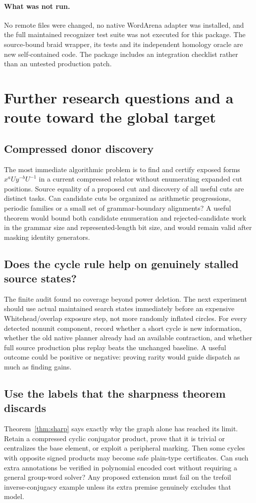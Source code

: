 \documentclass[11pt]{article}
\theoremstyle{definition}\newtheorem{definition}[theorem]{Definition}
\theoremstyle{remark}\newtheorem{remark}[theorem]{Remark}
\begin{document}
\paragraph{What was not run.}
No remote files were changed, no native WordArena adapter was installed,
and the full maintained recognizer test suite was not executed for this
package. The source-bound braid wrapper, its tests and its independent
homology oracle are new self-contained code. The package includes an
integration checklist rather than an untested production patch.

\section{Further research questions and a route toward the global target}
\label{sec:questions}
\subsection{Compressed donor discovery}
The most immediate algorithmic problem is to find and certify exposed
forms $x^a U y^{-b}U^{-1}$ in a current compressed relator without
enumerating expanded cut positions. Source equality of a proposed cut
and discovery of all useful cuts are distinct tasks. Can candidate cuts
be organized as arithmetic progressions, periodic families or a small
set of grammar-boundary alignments? A useful theorem would bound both
candidate enumeration and rejected-candidate work in the grammar size
and represented-length bit size, and would remain valid after masking
identity generators.

\subsection{Does the cycle rule help on genuinely stalled source states?}
The finite audit found no coverage beyond power deletion. The next
experiment should use actual maintained search states immediately before
an expensive Whitehead/overlap exposure step, not more randomly inflated
circles. For every detected nonunit component, record whether a short
cycle is new information, whether the old native planner already had an
available contraction, and whether full source production plus replay
beats the unchanged baseline. A useful outcome could be positive or
negative: proving rarity would guide dispatch as much as finding gains.

\subsection{Use the labels that the sharpness theorem discards}
Theorem~\ref{thm:sharp} says exactly why the graph alone has reached its
limit. Retain a compressed cyclic conjugator product, prove that it is
trivial or centralizes the base element, or exploit a peripheral marking.
Then some cycles with opposite signed products may become safe plain-type
certificates. Can such extra annotations be verified in polynomial
encoded cost without requiring a general group-word solver? Any proposed
extension must fail on the trefoil inverse-conjugacy example unless its
extra premise genuinely excludes that model.
\end{document}
